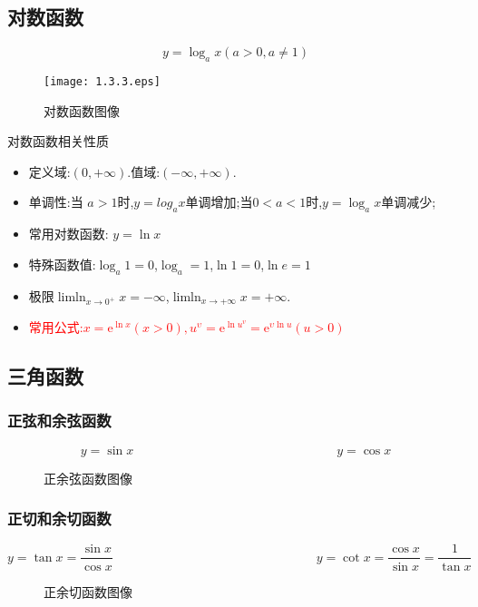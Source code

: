 \documentclass[12pt, a4paper, oneside, UTF8]{ctexbook}  %
\begin{document}
\subsection{对数函数}
$$
    y=\log_a x (a>0,a \neq 1)
$$

\begin{figure}[H]
    \centering \texttt{[image: 1.3.3.eps]} \caption{对数函数图像}
\end{figure}
\begin{criterion}{对数函数相关性质}{}
    \begin{itemize}
        \item 定义域:$(0,+\infty)$.值域:$(-\infty,+\infty)$.
        \item 单调性:当 $a>1$时,$y=log_a x$单调增加;当$0<a<1$时,$y=\log_a x$单调减少;
        \item 常用对数函数: $y=\ln x$
        \item 特殊函数值:$\log_a 1=0$,$\log_a=1$,$\ln 1=0$,$\ln e=1$
        \item 极限$\operatorname*{lim ln}_{x\to0^{+}}x=-\infty$,$\operatorname*{lim ln}_{x\to+\infty}x=+\infty$.
        \item \textcolor{red}{常用公式:$x=\mathrm{e}^{\ln x}\left(x>0\right),u^{\upsilon}=\mathrm{e}^{\ln u^v}=\mathrm{e}^{\upsilon\ln u}\left(u>0\right)$}
    \end{itemize}
\end{criterion}
\subsection{三角函数}

\subsubsection{正弦和余弦函数}
$$
    \boxed{y=\sin x}
    \qquad \qquad \qquad \qquad \qquad \qquad \qquad \qquad
    \boxed{y=\cos x}
$$
\begin{figure}[H] \centering
    \caption{ 正余弦函数图像}
\end{figure}

\subsubsection{正切和余切函数}
$$
    \boxed{y=\tan x=\frac{\sin x}{\cos x}}
    \qquad \qquad \qquad \qquad \qquad \qquad \qquad \qquad
    \boxed{y=\cot x=\frac{\cos x}{\sin x}=\frac{1}{\tan x}}
$$
\begin{figure}[H] \centering
    \caption{正余切函数图像}
\end{figure}
\end{document}
